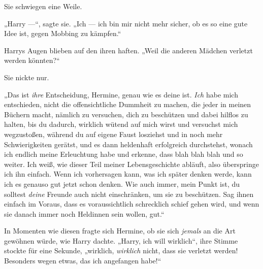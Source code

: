 Sie schwiegen eine Weile.

„Harry —“, sagte sie.
„Ich — ich bin mir nicht mehr sicher, ob es so eine gute Idee ist, gegen Mobbing zu kämpfen.“

Harrys Augen blieben auf den ihren haften.
„Weil die anderen Mädchen verletzt werden könnten?“

Sie nickte nur.

„Das ist \emph{ihre} Entscheidung, Hermine, genau wie es deine ist. \emph{Ich} habe mich entschieden, nicht die offensichtliche Dummheit zu machen, die jeder in meinen Büchern macht, nämlich zu versuchen, dich zu beschützen und dabei hilflos zu halten, bis du dadurch, wirklich wütend auf mich wirst und versuchst mich wegzustoßen, während du auf eigene Faust losziehst und in noch mehr Schwierigkeiten gerätst, und es dann heldenhaft erfolgreich durchstehst, wonach ich endlich meine Erleuchtung habe und erkenne, dass blah blah blah und so weiter. Ich weiß, wie dieser Teil meiner Lebensgeschichte abläuft, also überspringe ich ihn einfach. Wenn ich vorhersagen kann, was ich später denken werde, kann ich es genauso gut jetzt schon denken. Wie auch immer, mein Punkt ist, du solltest \emph{deine} Freunde auch nicht einschränken, um sie zu beschützen. Sag ihnen einfach im Voraus, dass es voraussichtlich schrecklich schief gehen wird, und wenn sie danach immer noch Heldinnen sein wollen, gut.“

In Momenten wie diesen fragte sich Hermine, ob sie sich \emph{jemals} an die Art gewöhnen würde, wie Harry dachte.
„Harry, ich will wirklich“, ihre Stimme stockte für eine Sekunde, „wirklich, \emph{wirklich} nicht, dass sie verletzt werden! Besonders wegen etwas, das ich angefangen habe!“

